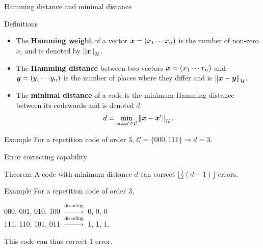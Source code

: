 \documentclass[10pt]{beamer}
\newcommand{\hw}[1]{\norm{#1}_\mathcal{H}}
\begin{document}
\begin{frame}{Hamming distance and minimal distance}
    \begin{block}{Definitions}
        \begin{itemize}
            \item The \textbf{Hamming weight} of a vector $\boldsymbol{x} = (x_1\cdots x_n)$ is the number
            of non-zero $x_i$ and is denoted by $\hw{\vx}$.
            \item The \textbf{Hamming distance} between two vectors $\boldsymbol{x} = (x_1\cdots x_n)$ and
            $\boldsymbol{y} = (y_1\cdots y_n)$ is the number of places where they differ and is
            $\hw{\vx-\vy}$.
            \item The \textbf{minimal distance} of a code is the minimum Hamming distance between
            its codewords and is denoted $d$
            \[ d = \min_{\vx\neq \vx' \in \mathcal{C}} \hw{\vx-\vx'}. \]
        \end{itemize}
    \end{block}

    \begin{exampleblock}{Example}
        For a repetition code of order 3, $\mathcal{C} = \{000, 111\} \Rightarrow d = 3$.
    \end{exampleblock}
\end{frame}

\begin{frame}{Error correcting capability}
    \begin{block}{Theorem}
        A code with minimum distance $d$ can correct $\lfloor\frac{1}{2}(d-1)\rfloor$ errors.
    \end{block}

    \begin{exampleblock}{Example}
        For a repetition code of order 3,
        \begin{center}
            000, 001, 010, 100 $\xrightarrow{\text{decoding}}$ 0, 0, 0 \\
            111, 110, 101, 011 $\xrightarrow{\text{decoding}}$ 1, 1, 1. 
        \end{center}
        This code can thus correct 1 error.
    \end{exampleblock}
\end{frame}

\end{document}

